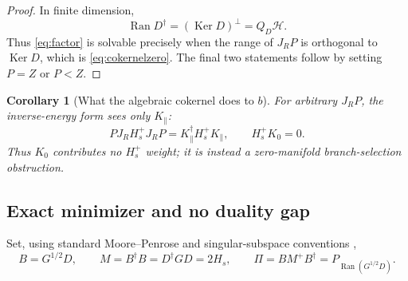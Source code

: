 \documentclass[11pt]{article}
\newtheorem{corollary}[theorem]{Corollary}
\theoremstyle{definition}
\theoremstyle{remark}
\newcommand{\Ran}{\operatorname{Ran}}
\newcommand{\Ker}{\operatorname{Ker}}
\newcommand{\cH}{\mathcal H}
\begin{document}
\begin{proof}
In finite dimension,
\[
 \Ran D^\dagger=(\Ker D)^\perp=Q_D\cH.
\]
Thus \eqref{eq:factor} is solvable precisely when the range of $J_RP$ is orthogonal to $\Ker D$, which is \eqref{eq:cokernelzero}.  The final two statements follow by setting $P=Z$ or $P<Z$.
\end{proof}

\begin{corollary}[What the algebraic cokernel does to $b$]
For arbitrary $J_RP$, the inverse-energy form sees only $K_\parallel$:
\begin{equation}
 PJ_RH_s^+J_RP=K_\parallel^\dagger H_s^+K_\parallel,
 \qquad H_s^+K_0=0.
 \label{eq:cokernelweightzero}
\end{equation}
Thus $K_0$ contributes no $H_s^+$ weight; it is instead a zero-manifold branch-selection obstruction.
\end{corollary}

\subsection{Exact minimizer and no duality gap}

Set, using standard Moore--Penrose and singular-subspace conventions \cite{GolubVanLoan},
\begin{equation}
 B=G^{1/2}D,
 \qquad
 M=B^\dagger B=D^\dagger GD=2H_s,
 \qquad
 \Pi=B M^+B^\dagger=P_{\Ran(G^{1/2}D)}.
 \label{eq:BMPi}
\end{equation}
\end{document}
